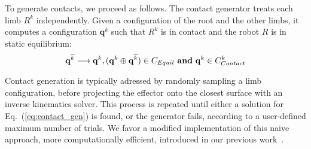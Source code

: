To generate contacts, we proceed as follows.
The contact generator treats each limb $R^k$ independently.
Given a configuration of the root and the other limbs, it computes a configuration $\mathbf{q}^k$ such that $R^k$ is in contact and the robot $R$ is in static equilibrium:
\begin{equation}
\label{eq:contact_gen}
	\mathbf{q}^{\overline{k}}  \longrightarrow \mathbf{q}^k, (\mathbf{q}^{k} \oplus \mathbf{q}^{\overline{k}}) \in  C_{Equil} \textrm{ \textbf{and}}\ \mathbf{q}^k \in  C_{Contact}^k 
\end{equation}

Contact generation is typically adressed by randomly sampling a limb configuration, before projecting the effector onto the closest surface with an inverse kinematics solver.
This process is repeated until either a solution for Eq.~(\ref{eq:contact_gen}) is found, or the generator fails, according to a user-defined maximum number of trials.
We favor a modified implementation of this naive approach, more computationally efficient, introduced in our previous work~\citep{Tonneau2014}.




